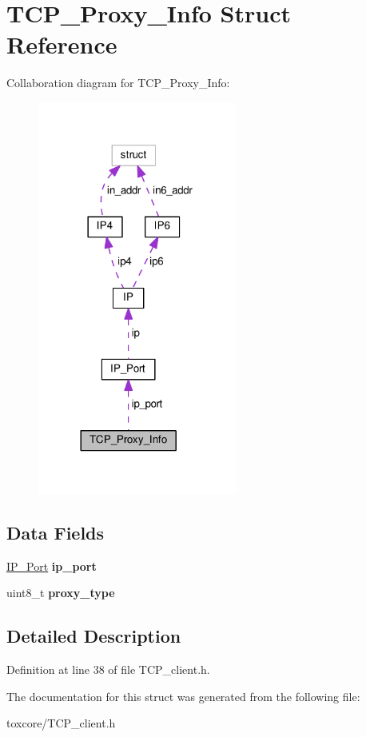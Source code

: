 \hypertarget{struct_t_c_p___proxy___info}{\section{T\+C\+P\+\_\+\+Proxy\+\_\+\+Info Struct Reference}
\label{struct_t_c_p___proxy___info}
}


Collaboration diagram for T\+C\+P\+\_\+\+Proxy\+\_\+\+Info\+:\nopagebreak
\begin{figure}[H]
\begin{center}
\leavevmode
\includegraphics[width=185pt]{struct_t_c_p___proxy___info__coll__graph}
\end{center}
\end{figure}
\subsection*{Data Fields}
\begin{DoxyCompactItemize}
\item 
\hypertarget{struct_t_c_p___proxy___info_a86e2a5a56c0dd22df6e8b8a10e40f9e4}{\hyperlink{struct_i_p___port}{I\+P\+\_\+\+Port} {\bfseries ip\+\_\+port}}\label{struct_t_c_p___proxy___info_a86e2a5a56c0dd22df6e8b8a10e40f9e4}

\item 
\hypertarget{struct_t_c_p___proxy___info_a23a098bd0536ae2000e1944e353b7d8b}{uint8\+\_\+t {\bfseries proxy\+\_\+type}}\label{struct_t_c_p___proxy___info_a23a098bd0536ae2000e1944e353b7d8b}

\end{DoxyCompactItemize}


\subsection{Detailed Description}


Definition at line 38 of file T\+C\+P\+\_\+client.\+h.



The documentation for this struct was generated from the following file\+:\begin{DoxyCompactItemize}
\item 
toxcore/T\+C\+P\+\_\+client.\+h\end{DoxyCompactItemize}
